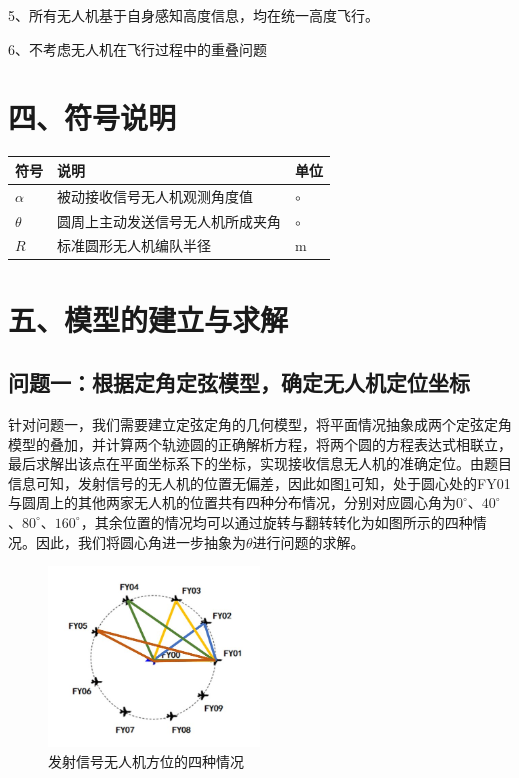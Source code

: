 \documentclass{my_paper}
\begin{document}
5、所有无人机基于自身感知高度信息，均在统一高度飞行。

6、不考虑无人机在飞行过程中的重叠问题


\section{四、符号说明}
\begin{table}[h]%
    \centering
    \begin{tabular}{p{2.0cm}<{\centering}p{9.0cm}<{\centering}p{2.0cm}<{\centering}}
        \hline
        符号     & 说明                             & 单位    \\ %
        \hline
        $\alpha$ & 被动接收信号无人机观测角度值     & $\circ$ \\ %
        $\theta$ & 圆周上主动发送信号无人机所成夹角 & $\circ$ \\ %
        $R$ & 标准圆形无人机编队半径 & m\\
        \hline
    \end{tabular}
\end{table}


\section{五、模型的建立与求解}




\subsection{问题一：根据定角定弦模型，确定无人机定位坐标}
针对问题一，我们需要建立定弦定角的几何模型，将平面情况抽象成两个定弦定角模型的叠加，并计算两个轨迹圆的正确解析方程，将两个圆的方程表达式相联立，最后求解出该点在平面坐标系下的坐标，实现接收信息无人机的准确定位。由题目信息可知，发射信号的无人机的位置无偏差，因此如图\ref{sizhong}可知，处于圆心处的FY01与圆周上的其他两家无人机的位置共有四种分布情况，分别对应圆心角为$0^{\circ}$、$40^{\circ}$、$80^{\circ}$、$160^{\circ}$，其余位置的情况均可以通过旋转与翻转转化为如图所示的四种情况。因此，我们将圆心角进一步抽象为$\theta$进行问题的求解。


\begin{figure}[h]
    \centering
    \includegraphics[width=0.5\textwidth]{sizhong.jpg}
    \caption{发射信号无人机方位的四种情况}
    \label{sizhong}
\end{figure}
\end{document}
